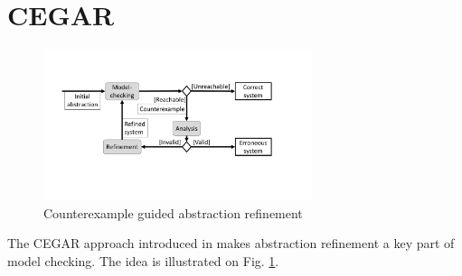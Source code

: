 



\section{CEGAR}

\begin{figure} [b]
	\centering
	\includegraphics [width=0.7\textwidth] {include/figures/cegar_flow_black}
	\caption{Counterexample guided abstraction refinement}
	\label{fig:cegar}
\end{figure}

The CEGAR approach introduced in \cite{clarke2003counterexample} makes
abstraction refinement a key part of model checking. The idea is illustrated on
Fig. \ref{fig:cegar}.

